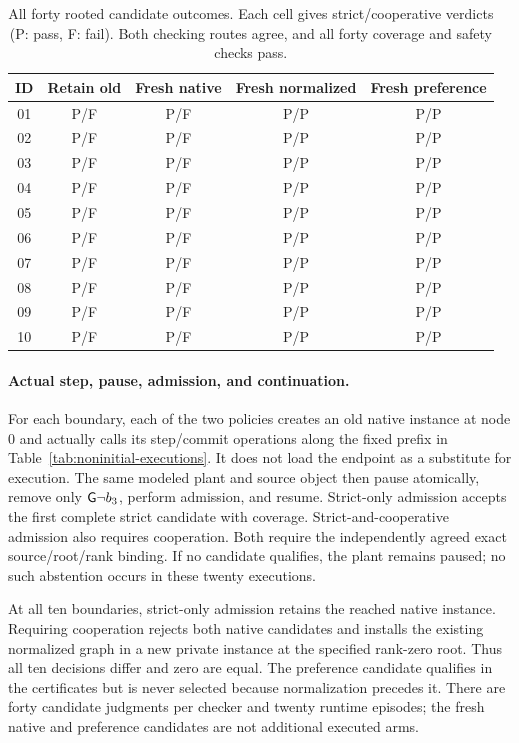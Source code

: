 \begin{table}[htbp]
\centering\small
\caption{All forty rooted candidate outcomes. Each cell gives
strict/cooperative verdicts (P: pass, F: fail). Both checking routes
agree, and all forty coverage and safety checks pass.}
\label{tab:noninitial-verdicts}
\begin{tabular}{@{}ccccc@{}}
\toprule
ID & Retain old & Fresh native & Fresh normalized & Fresh preference\\
\midrule
01 & P/F & P/F & P/P & P/P \\
02 & P/F & P/F & P/P & P/P \\
03 & P/F & P/F & P/P & P/P \\
04 & P/F & P/F & P/P & P/P \\
05 & P/F & P/F & P/P & P/P \\
06 & P/F & P/F & P/P & P/P \\
07 & P/F & P/F & P/P & P/P \\
08 & P/F & P/F & P/P & P/P \\
09 & P/F & P/F & P/P & P/P \\
10 & P/F & P/F & P/P & P/P \\
\bottomrule
\end{tabular}
\end{table}

\paragraph{Actual step, pause, admission, and continuation.}
For each boundary, each of the two policies creates an old native
instance at node 0 and actually calls its step/commit operations along
the fixed prefix in Table~\ref{tab:noninitial-executions}. It does not load
the endpoint as a substitute for execution. The same modeled plant and
source object then pause atomically, remove only $\mathsf{G}\neg b_3$, perform
admission, and resume. Strict-only admission accepts the first complete
strict candidate with coverage. Strict-and-cooperative admission also
requires cooperation. Both require the independently agreed exact
source/root/rank binding. If no candidate qualifies, the plant remains
paused; no such abstention occurs in these twenty executions.

At all ten boundaries, strict-only admission retains the reached native
instance. Requiring cooperation rejects both native candidates and
installs the existing normalized graph in a new private instance at the
specified rank-zero root. Thus all ten decisions differ and zero are
equal. The preference candidate qualifies in the certificates but is
never selected because normalization precedes it. There are forty
candidate judgments per checker and twenty runtime episodes; the fresh
native and preference candidates are not additional executed arms.


